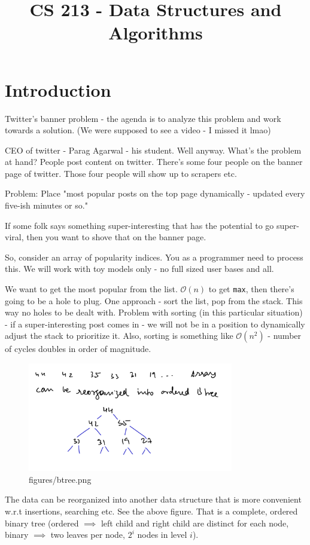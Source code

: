 \documentclass[a4paper]{article}
\title{CS 213 - Data Structures and Algorithms}
\begin{document}
\maketitle	
\section{Introduction}
Twitter's banner problem - the agenda is to analyze this problem and
work towards a solution. (We were supposed to see a video - I missed it lmao)

CEO of twitter - Parag Agarwal - his student. Well anyway. What's the
problem at hand? People post content on twitter. There's some four people
on the banner page of twitter. Those four people will show up to scrapers etc.

Problem: Place "most popular  posts on the top page dynamically - updated every five-ish minutes or so."

If some folk says something super-interesting that has the potential
to go super-viral, then you want to  shove that on the banner page.

So, consider an array of popularity indices. You as a programmer need
to process this. We will work with toy models only - no full sized
user bases and all.

We want to get the most popular from the list. $\mathcal{O}(n)$ to
get \texttt{max},  then there's going to be a hole to plug. One approach - 
sort the list, pop from the stack. This way no holes to be dealt with.
Problem with sorting (in this particular situation) - if a super-interesting post comes in - we will
not be in a position to dynamically adjust the stack to prioritize it.
Also, sorting is something like $\mathcal{O}(n^2)$ - number of cycles
doubles in order of magnitude.  

\begin{figure}[h]
	\centering
	\includegraphics[width=0.8\textwidth]{figures/btree.png}
	\caption{figures/btree.png}
	\label{fig:Ordered binary tree - root, left child, right child}
\end{figure}
The data can be reorganized into another data structure that is more
convenient w.r.t insertions, searching etc. See the above figure.
That is a complete, ordered binary tree (ordered $\implies$ left child
and right child are  distinct for each node, binary $\implies$ two leaves per node, $2^{i}$ nodes in level $i$).
\end{document}
